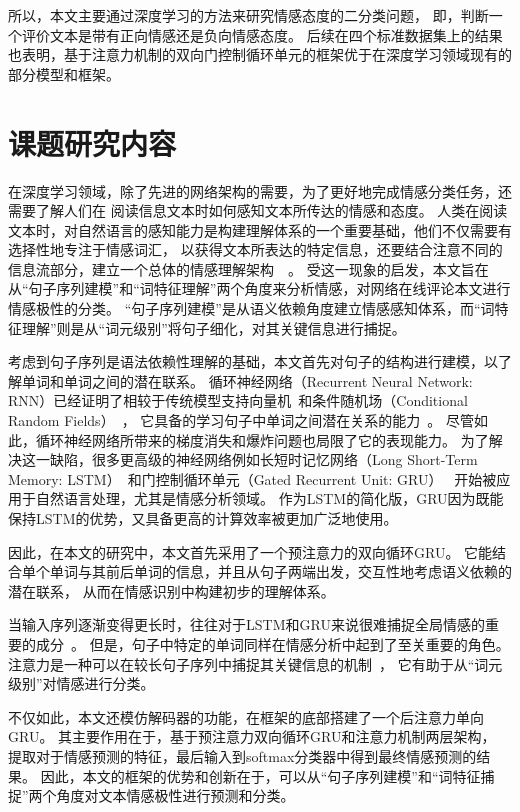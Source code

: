 所以，本文主要通过深度学习的方法来研究情感态度的二分类问题，
即，判断一个评价文本是带有正向情感还是负向情感态度。
后续在四个标准数据集上的结果也表明，基于注意力机制的双向门控制循环单元的框架优于在深度学习领域现有的部分模型和框架。

\section{课题研究内容}
在深度学习领域，除了先进的网络架构的需要，为了更好地完成情感分类任务，还需要了解人们在
阅读信息文本时如何感知文本所传达的情感和态度。
人类在阅读文本时，对自然语言的感知能力是构建理解体系的一个重要基础，他们不仅需要有选择性地专注于情感词汇，
以获得文本所表达的特定信息，还要结合注意不同的信息流部分，建立一个总体的情感理解架构~~。
受这一现象的启发，本文旨在从“句子序列建模”和“词特征理解”两个角度来分析情感，对网络在线评论本文进行情感极性的分类。
“句子序列建模”是从语义依赖角度建立情感感知体系，而“词特征理解”则是从“词元级别”将句子细化，对其关键信息进行捕捉。

考虑到句子序列是语法依赖性理解的基础，本文首先对句子的结构进行建模，以了解单词和单词之间的潜在联系。
循环神经网络（Recurrent Neural Network: RNN）已经证明了相较于传统模型支持向量机~和条件随机场（Conditional Random Fields）~，
它具备的学习句子中单词之间潜在关系的能力~。
尽管如此，循环神经网络所带来的梯度消失和爆炸问题也局限了它的表现能力。
为了解决这一缺陷，很多更高级的神经网络例如长短时记忆网络（Long Short-Term Memory: LSTM）~和门控制循环单元（Gated Recurrent Unit: GRU）~
开始被应用于自然语言处理，尤其是情感分析领域。
作为LSTM的简化版，GRU因为既能保持LSTM的优势，又具备更高的计算效率被更加广泛地使用。

因此，在本文的研究中，本文首先采用了一个预注意力的双向循环GRU。
它能结合单个单词与其前后单词的信息，并且从句子两端出发，交互性地考虑语义依赖的潜在联系，
从而在情感识别中构建初步的理解体系。

当输入序列逐渐变得更长时，往往对于LSTM和GRU来说很难捕捉全局情感的重要的成分~。
但是，句子中特定的单词同样在情感分析中起到了至关重要的角色。
注意力是一种可以在较长句子序列中捕捉其关键信息的机制~，
它有助于从“词元级别”对情感进行分类。

不仅如此，本文还模仿解码器的功能，在框架的底部搭建了一个后注意力单向GRU。
其主要作用在于，基于预注意力双向循环GRU和注意力机制两层架构，
提取对于情感预测的特征，最后输入到softmax分类器中得到最终情感预测的结果。
因此，本文的框架的优势和创新在于，可以从“句子序列建模”和“词特征捕捉”两个角度对文本情感极性进行预测和分类。

